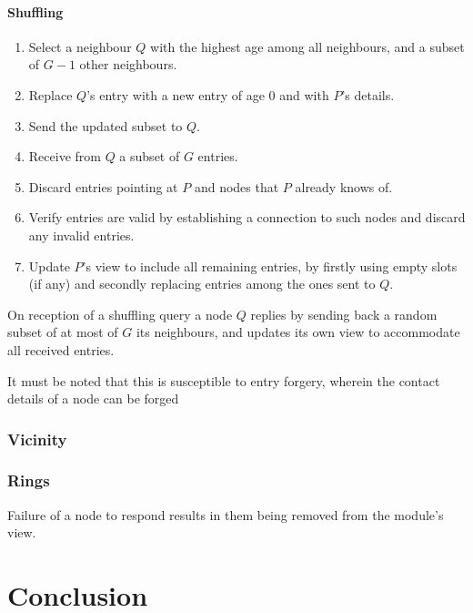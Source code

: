 \documentclass[10pt,a4paper,onecolumn]{article}
\begin{document}
\paragraph*{Shuffling}
\begin{enumerate}
\item Select a neighbour $Q$ with the highest age among all neighbours, and a subset of $G-1$ other neighbours.
\item Replace $Q$'s entry with a new entry of age 0 and with $P$'s details.
\item Send the updated subset to $Q$.
\item Receive from $Q$ a subset of $G$ entries.
\item Discard entries pointing at $P$ and nodes that $P$ already knows of.
\item Verify entries are valid by establishing a connection to such nodes and discard any invalid entries.
\item Update $P$'s view to include all remaining entries, by firstly using empty slots (if any) and secondly replacing entries among the ones sent to $Q$.
\end{enumerate}

On reception of a shuffling query a node $Q$ replies by sending back a random subset of at most of $G$ its neighbours, and updates its own view to accommodate all received entries. 

It must be noted that this is susceptible to entry forgery, wherein the contact details of a node can be forged

\subsubsection*{Vicinity}


\subsubsection*{Rings}

Failure of a node to respond results in them being removed from the module's view.

\section{Conclusion}


\end{document}
